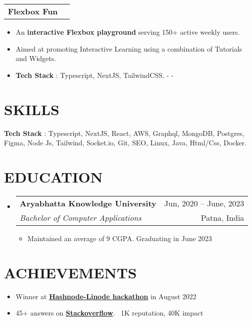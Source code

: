 \documentclass[letterpaper,11pt]{article}
\makeatletter
\newcommand{\myuline}[1]{%
  \uline{\phantom{#1}}%
  \llap{\contour{white}{#1}}%
}
\newcommand{\resumeItem}[1]{
  \item\small{
    {#1 \vspace{-1pt}}
  }
}
\newcommand{\resumeSubheading}[4]{
  \vspace{-1pt}\item
    \begin{tabular*}{\textwidth}[t]{l@{\extracolsep{\fill}}r}
      \textbf{#1} & {\color{dark-grey}\small #2}\vspace{1pt}\\ %
      \textit{#3} & {\color{dark-grey} \small #4}\\ %
    \end{tabular*}\vspace{-4pt}
}
\newcommand{\resumeProjectHeading}[2]{
    \item
    \begin{tabular*}{\textwidth}{l@{\extracolsep{\fill}}r}
      #1 & {\color{dark-grey}} \\
    \end{tabular*}\vspace{-4pt}
}
\newcommand{\resumeSubHeadingListStart}{\begin{itemize}[leftmargin=0in, label={}]}
\newcommand{\resumeSubHeadingListEnd}{\end{itemize}}
\newcommand{\resumeItemListStart}{\begin{itemize}}
\newcommand{\resumeItemListEnd}{\end{itemize}\vspace{0pt}}
\makeatother
\begin{document}
        \resumeProjectHeading
          {\textbf{Flexbox Fun}}{Sept, 2020 -- Nov, 2020}
          \resumeItemListStart
            \resumeItem{An \textbf{interactive Flexbox playground} serving 150+ active weekly users.}
            \resumeItem{Aimed at promoting Interactive Learning using a combination of Tutorials and Widgets.}
            \resumeItem{\textbf{Tech Stack} : Typescript, NextJS, TailwindCSS.  - \href{https://github.com/alsoamit/flexbox.fun}{\faGithub} 
 \href{https://github.com/alsoamit/flexbox.fun}{\myuline{Github}}  - \href{https://www.flexbox.fun/}{\faIoxhost }
          \href{https://www.flexbox.fun/}{\myuline{Live}}}
          \resumeItemListEnd
\section{SKILLS}
 \begin{itemize}[leftmargin=0in, label={}]
    \small{\item{
     \textbf{Tech Stack} {: Typescript, NextJS, React, AWS, Graphql, MongoDB, Postgres, Figma, Node Js, Tailwind, Socket.io, Git, SEO, Linux, Java, Html/Css, Docker.}
     }}
 \end{itemize}

\section {EDUCATION}
  \resumeSubHeadingListStart
    \resumeSubheading
      {Aryabhatta Knowledge University}{Jun, 2020 -- June, 2023}
      {Bachelor of Computer Applications}{Patna, India}
      \resumeItemListStart
      \resumeItem{Maintained an average of 9 CGPA. Graduating in June 2023}
      \resumeItemListEnd
  \resumeSubHeadingListEnd
%

\section{ACHIEVEMENTS}
\begin{itemize}[leftmargin=0in, label={}]
    \resumeItemListStart
            \item{Winner at \href{https://townhall.hashnode.com/linode-x-hashnode-hackathon-winners}{\textbf{Hashnode-Linode hackathon}} in August 2022}
            \item{45+ answers on \textbf{\href{https://stackoverflow.com/users/14785394/amit}{Stackoverflow}}. ~1K reputation, 40K impact }
           
          \resumeItemListEnd
 \end{itemize}

\end{document}
